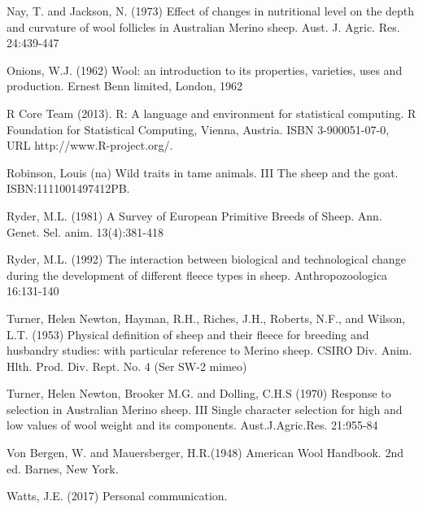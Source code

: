 \documentclass[titlepage]{article}  %
\begin{document}
\begin{thebibliography}{99}
Nay, T. and Jackson, N. (1973) Effect of changes in nutritional level on the depth and curvature of wool follicles in Australian Merino sheep. Aust. J. Agric. Res. 24:439-447

Onions, W.J. (1962) Wool: an introduction to its properties, varieties, uses
     and production. Ernest Benn limited, London, 1962

R Core Team (2013). R: A language and environment for statistical
  computing. R Foundation for Statistical Computing, Vienna, Austria.
  ISBN 3-900051-07-0, URL http://www.R-project.org/.

Robinson, Louis (na) Wild traits in tame animals. III The sheep and the goat. ISBN:1111001497412PB.

Ryder, M.L. (1981) A Survey of European Primitive Breeds of Sheep. Ann. Genet. Sel. anim. 13(4):381-418

Ryder, M.L. (1992) The interaction between biological and technological change during the development of different fleece types in sheep. Anthropozoologica 16:131-140

Turner, Helen Newton, Hayman, R.H., Riches, J.H., Roberts, N.F., and Wilson, L.T. (1953) Physical definition of sheep and their fleece for breeding and husbandry studies: with particular reference to Merino sheep. CSIRO Div. Anim. Hlth. Prod. Div. Rept. No. 4 (Ser SW-2 mimeo)


Turner, Helen Newton, Brooker M.G. and Dolling, C.H.S (1970) Response to selection in Australian Merino sheep. III Single character selection for high and low values of wool weight and its components. Aust.J.Agric.Res. 21:955-84

Von Bergen, W. and Mauersberger, H.R.(1948) American Wool Handbook. 2nd ed. Barnes, New York.

Watts, J.E. (2017) Personal communication.
\end{thebibliography}
\end{document}
